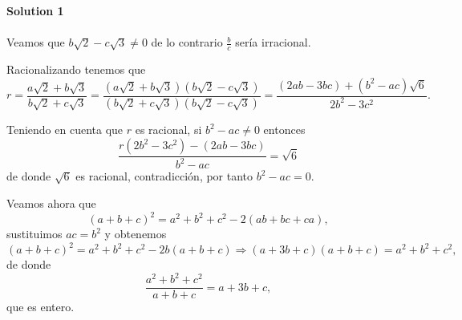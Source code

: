 \noindent\textbf{Solution 1}\\\\

Veamos que $b\sqrt{2} - c\sqrt{3} \neq 0$ de lo contrario $\frac{b}{c}$ sería irracional.

Racionalizando tenemos que
$$r = \frac{a\sqrt{2} + b\sqrt{3}}{b\sqrt{2} + c\sqrt{3}} = \frac{(a\sqrt{2} + b\sqrt{3})(b\sqrt{2} - c\sqrt{3})}{(b\sqrt{2} + c\sqrt{3})(b\sqrt{2} - c\sqrt{3})} = \frac{(2ab - 3bc) + (b^2-ac) \sqrt{6}}{2b^2 - 3c^2}.$$

Teniendo en cuenta que $r$ es racional, si $b^2 - ac\neq 0$ entonces 
$$
\frac{r(2b^2 - 3c^2)-(2ab - 3bc)}{b^2 - ac} = \sqrt{6}
$$
de donde $\sqrt{6}$ es racional, contradicción, por tanto $b^2 - ac = 0.$

Veamos ahora que 
$$(a + b + c)^2 = a^2 + b^2 + c^2 - 2(ab + bc + ca),$$
sustituimos $ac = b^2$ y obtenemos 
$$(a + b + c)^2 = a^2 + b^2 + c^2 - 2b(a + b + c) \Rightarrow (a + 3b + c)(a + b + c) = a^2 + b^2 + c^2,$$
de donde
$$\frac{a^2 + b^2 + c^2}{a + b + c} = a + 3b + c,$$ que es entero. 